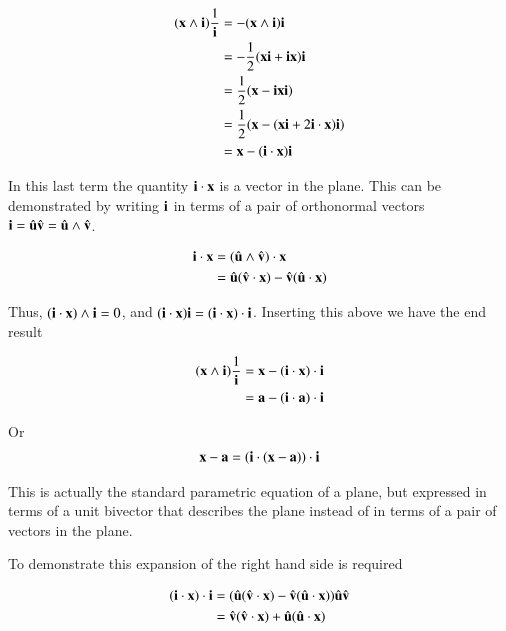 \documentclass{article}
\begin{document}
\begin{align*}
(\mathbf{x} \wedge \mathbf{i})\frac{1}{\mathbf{i}} 
&= -(\mathbf{x} \wedge \mathbf{i}){\mathbf{i}} \\ 
&= -\frac{1}{2}(\mathbf{x}\mathbf{i} + \mathbf{i}\mathbf{x}){\mathbf{i}} \\ 
&= \frac{1}{2}(\mathbf{x} - \mathbf{i}\mathbf{x}\mathbf{i}) \\ 
&= \frac{1}{2}(\mathbf{x} - (\mathbf{x} \mathbf{i} + 2 \mathbf{i} \cdot \mathbf{x})\mathbf{i}) \\ 
&= \mathbf{x} - (\mathbf{i} \cdot \mathbf{x})\mathbf{i} \\ 
\end{align*}

In this last term the quantity $\mathbf{i} \cdot \mathbf{x}$ is a vector in the plane.
This can be demonstrated by writing $\mathbf{i}$ in terms of a pair of orthonormal
vectors $\mathbf{i} = \hat{\mathbf{u}}\hat{\mathbf{v}} = \hat{\mathbf{u}} \wedge \hat{\mathbf{v}}$.

\begin{align*}
\mathbf{i} \cdot \mathbf{x} &= (\hat{\mathbf{u}} \wedge \hat{\mathbf{v}}) \cdot \mathbf{x} \\
              &= \hat{\mathbf{u}} (\hat{\mathbf{v}} \cdot \mathbf{x}) - \hat{\mathbf{v}} (\hat{\mathbf{u}} \cdot \mathbf{x}) \\
\end{align*}

Thus, $(\mathbf{i} \cdot \mathbf{x}) \wedge \mathbf{i} = 0$, 
and $(\mathbf{i} \cdot \mathbf{x}) \mathbf{i} = (\mathbf{i} \cdot \mathbf{x}) \cdot \mathbf{i}$.  Inserting this above
we have the end result

\begin{align*}
(\mathbf{x} \wedge \mathbf{i})\frac{1}{\mathbf{i}} 
&= \mathbf{x} - (\mathbf{i} \cdot \mathbf{x}) \cdot \mathbf{i} \\ 
&= \mathbf{a} - (\mathbf{i} \cdot \mathbf{a}) \cdot \mathbf{i} \\ 
\end{align*}

Or
\begin{align*}
\mathbf{x}  - \mathbf{a} 
&= (\mathbf{i} \cdot (\mathbf{x} - \mathbf{a})) \cdot \mathbf{i} \\ 
\end{align*}

This is actually the standard parametric equation of a plane, but expressed
in terms of a unit bivector that describes the plane instead of in terms
of a pair of vectors in the plane.

To demonstrate this expansion of the right hand side is required

\begin{align*}
(\mathbf{i} \cdot \mathbf{x}) \cdot \mathbf{i}
&= (\hat{\mathbf{u}} (\hat{\mathbf{v}} \cdot \mathbf{x}) - \hat{\mathbf{v}} (\hat{\mathbf{u}} \cdot \mathbf{x})) \hat{\mathbf{u}} \hat{\mathbf{v}} \\
&= \hat{\mathbf{v}} (\hat{\mathbf{v}} \cdot \mathbf{x}) + \hat{\mathbf{u}} (\hat{\mathbf{u}} \cdot \mathbf{x}) \\
\end{align*}
\end{document}
